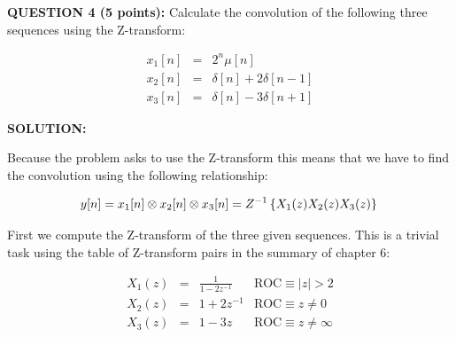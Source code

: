 \documentclass[a4paper,11pt,oneside]{article}
\def\W{{W_M}}
\begin{document}
%
%
%
%
%



\vspace{1cm}

\textbf{QUESTION 4 (5 points):} Calculate the convolution of the following three sequences using the Z-transform:

\begin{eqnarray}
x_1[n]&=&2^n\mu[n]\\
x_2[n]&=&\delta[n]+2\delta[n-1]\\
x_3[n]&=&\delta[n]-3\delta[n+1]
\end{eqnarray}


\vspace{1cm}

\textbf{SOLUTION:}

Because the problem asks to use the Z-transform this means that we have to find the convolution using the following relationship:

\begin{equation}
y[n]=x_1[n]\otimes x_2[n] \otimes x_3[n] = Z^{-1}\left\{X_1(z)X_2(z)X_3(z)\right\}\\
\end{equation}

First we compute the Z-transform of the three given sequences. This is a trivial task using the table of Z-transform pairs in the summary of chapter 6:

\begin{equation}
\begin{array}{llll}
X_1(z)&=&\frac{1}{1-2z^{-1}} & \textrm{ROC} \equiv |z|>2\\
X_2(z)&=&1+2z^{-1} & \textrm{ROC} \equiv z\neq 0\\
X_3(z)&=&1-3z & \textrm{ROC} \equiv z\neq \infty
\end{array}
\end{equation}
\end{document}
